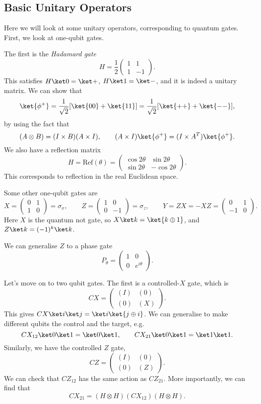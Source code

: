 \documentclass[12pt]{article}
\begin{document}
\subsection{Basic Unitary Operators}
\label{sub:bas_unit}

Here we will look at some unitary operators, corresponding to quantum gates. First, we look at one-qubit gates.

The first is the \emph{Hadamard gate}
\[
H = \frac{1}{2}
\begin{pmatrix}
	1 & 1 \\ 1 & -1
\end{pmatrix}.
\]
This satisfies $H \ket 0 = \ket +$, $H \ket 1 = \ket -$, and it is indeed a unitary matrix. We can show that
\[
	\ket{\phi^+} = \frac{1}{\sqrt 2} [\ket{00} + \ket{11}] = \frac{1}{\sqrt 2}[\ket{++} + \ket{--}],
\]
by using the fact that
\[
	(A \otimes B) = (I \times B) (A \times I), \qquad (A \times I)\ket{\phi^+} = (I \times A^{T})\ket{\phi^+}.
\]
We also have a reflection matrix
\[
H = \mathrm{Ref}(\theta)=
\begin{pmatrix}
	\cos 2 \theta & \sin 2 \theta \\ \sin 2 \theta & -\cos 2 \theta
\end{pmatrix}.
\]
This corresponds to reflection in the real Euclidean space.

Some other one-qubit gates are
\[
X =
\begin{pmatrix}
	0 & 1 \\ 1 & 0
\end{pmatrix}
= \sigma_x, \qquad Z =
\begin{pmatrix}
	1 & 0 \\ 0 & -1
\end{pmatrix}
=\sigma_z, \qquad Y = ZX = -XZ =
\begin{pmatrix}
	0 & 1 \\ -1 & 0
\end{pmatrix}.
\]
Here $X$ is the quantum not gate, so $X \ket k = \ket{k \oplus 1}$, and $Z \ket k = (-1)^k \ket k$.

We can generalise $Z$ to a phase gate
\[
P_\theta =
\begin{pmatrix}
	1 & 0 \\ 0 & e^{i\theta}
\end{pmatrix}.
\]

Let's move on to two qubit gates. The first is a controlled-$X$ gate, which is
\[
CX=
\begin{pmatrix}
	(I) & (0) \\ (0) & (X)
\end{pmatrix}.
\]
This gives $CX \ket i \ket j = \ket i \ket{j \oplus i}$. We can generalise to make different qubits the control and the target, e.g.
\[
CX_{12} \ket 0 \ket 1 = \ket 0 \ket 1, \qquad CX_{21} \ket 0 \ket 1 = \ket 1 \ket 1.
\]
Similarly, we have the controlled $Z$ gate,
\[
CZ=
\begin{pmatrix}
	(I) & (0) \\ (0) & (Z)
\end{pmatrix}.
\]
We can check that $CZ_{12}$ has the same action as $CZ_{21}$. More importantly, we can find that
\[
CX_{21} = (H \otimes H) (CX_{12})(H \otimes H).
\]
\end{document}
